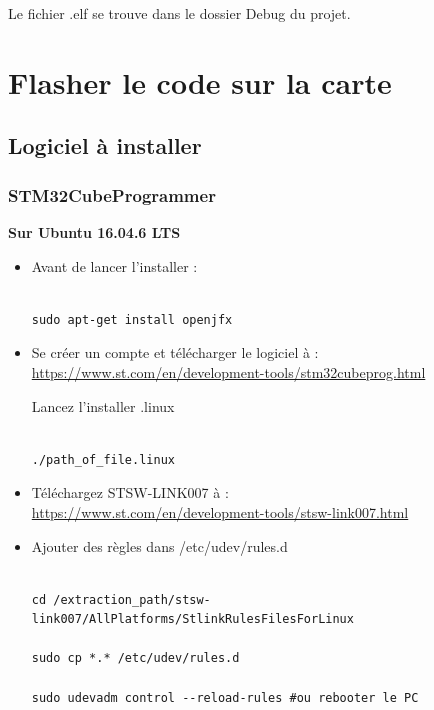 \documentclass{article}
\begin{document}
Le fichier .elf se trouve dans le dossier Debug du projet.

\section{Flasher le code sur la carte}
\subsection{Logiciel à installer}
\subsubsection{STM32CubeProgrammer}
\textbf{Sur Ubuntu 16.04.6 LTS}

\begin{itemize}
   



 \item Avant de lancer l'installer :
\begin{verbatim}

sudo apt-get install openjfx

\end{verbatim}

 \item Se créer un compte et télécharger le logiciel à : \\

\url{https://www.st.com/en/development-tools/stm32cubeprog.html}


Lancez l'installer .linux 
\begin{verbatim}

./path_of_file.linux

\end{verbatim}



\item Téléchargez STSW-LINK007 à : \\ 
\url{https://www.st.com/en/development-tools/stsw-link007.html}


\item Ajouter des règles dans /etc/udev/rules.d

\begin{verbatim}

cd /extraction_path/stsw-link007/AllPlatforms/StlinkRulesFilesForLinux

sudo cp *.* /etc/udev/rules.d

sudo udevadm control --reload-rules #ou rebooter le PC


\end{verbatim}

\end{itemize}
\end{document}
